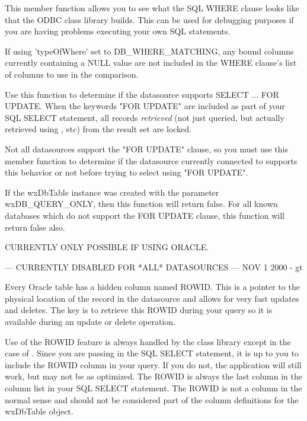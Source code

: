 
This member function allows you to see what the SQL WHERE clause looks like
that the ODBC class library builds.  This can be used for debugging purposes
if you are having problems executing your own SQL statements.

If using 'typeOfWhere' set to DB\_WHERE\_MATCHING, any bound columns currently
containing a NULL value are not included in the WHERE clause's list of
columns to use in the comparison.


\label{wxdbtablecanselectforupdate}


Use this function to determine if the datasource supports SELECT ... FOR UPDATE.
When the keywords "FOR UPDATE" are included as part of your SQL SELECT statement,
all records {\it retrieved} (not just queried, but actually retrieved using
, etc) from the result set are
locked.


Not all datasources support the "FOR UPDATE" clause, so you must use this
member function to determine if the datasource currently connected to supports
this behavior or not before trying to select using "FOR UPDATE".

If the wxDbTable instance was created with the parameter wxDB\_QUERY\_ONLY, then
this function will return false.  For all known databases which do not support
the FOR UPDATE clause, this function will return false also.

\label{wxdbtablecanupdatebyrowid}


CURRENTLY ONLY POSSIBLE IF USING ORACLE.

--- CURRENTLY DISABLED FOR *ALL* DATASOURCES --- NOV 1 2000 - gt

Every Oracle table has a hidden column named ROWID.  This is a pointer to the
physical location of the record in the datasource and allows for very fast
updates and deletes.  The key is to retrieve this ROWID during your query so
it is available during an update or delete operation.

Use of the ROWID feature is always handled by the class library except in the
case of .  Since
you are passing in the SQL SELECT statement,
it is up to you to include the ROWID column in your query.  If you do not,
the application will still work, but may not be as optimized.  The ROWID is
always the last column in the column list in your SQL SELECT statement.
The ROWID is not a column in the normal sense and should not be considered
part of the column definitions for the wxDbTable object.

